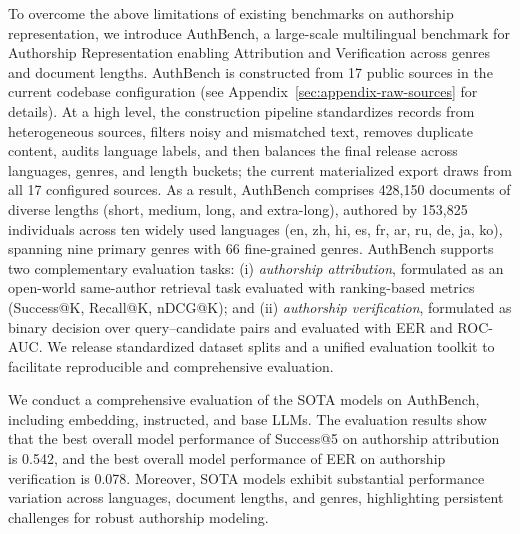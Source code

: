 \documentclass{article}
\newcommand{\rev}[1]{#1}
\newcommand{\rededit}[1]{{\color{editred}#1}}
\begin{document}
To overcome the above limitations of existing benchmarks on authorship representation, we introduce AuthBench, a large-scale multilingual benchmark for Authorship Representation enabling Attribution and Verification across genres and document lengths. AuthBench is constructed from \rededit{17 public sources in the current codebase configuration} (see Appendix~\ref{sec:appendix-raw-sources} for details). \rededit{At a high level, the construction pipeline standardizes records from heterogeneous sources, filters noisy and mismatched text, removes duplicate content, audits language labels, and then balances the final release across languages, genres, and length buckets; the current materialized export draws from all 17 configured sources.} As a result, AuthBench comprises \rededit{428,150} documents of diverse lengths (short, medium, long, and extra-long), authored by \rededit{153,825} individuals across ten widely used languages (en, zh, hi, es, fr, ar, ru, de, ja, ko), spanning \rededit{nine primary genres} with \rededit{66 fine-grained genres}. AuthBench supports two complementary evaluation tasks: (i) \emph{authorship attribution}, formulated as \rev{an open-world same-author} retrieval task evaluated with ranking-based metrics (Success@K, Recall@K, nDCG@K); and (ii) \emph{authorship verification}, formulated as binary decision over query--candidate pairs and evaluated \rev{with EER and ROC-AUC}. We release standardized dataset splits and a unified evaluation toolkit to facilitate reproducible and comprehensive evaluation.

We conduct a comprehensive evaluation of the SOTA models on AuthBench, including embedding, instructed, and base LLMs. The evaluation results show that the best overall model performance of Success@5 on authorship attribution is 0.542, and the best overall model performance of EER on \rev{authorship verification} is 0.078. Moreover, SOTA models exhibit substantial performance variation across languages, document lengths, and genres, highlighting persistent challenges for robust authorship modeling.
\end{document}
